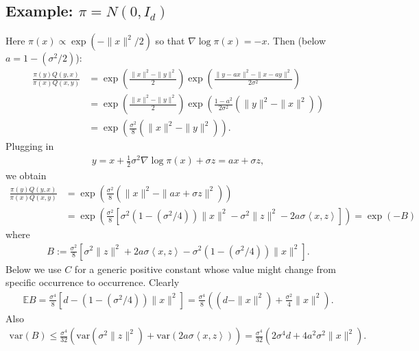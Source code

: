\documentclass{scrartcl}
\newcommand{\E}{{\mathbb E}}
\begin{document}
\subsection{Example: $\pi = N(0, I_d)$}
Here $\pi(x) \propto \exp(-\|x\|^2/2)$ so that $\nabla \log \pi(x) =
-x$. Then (below $a = 1 -(\sigma^2/2)$): 
\begin{align*}
  \frac{\pi(y) Q(y, x)}{\pi(x) Q(x, y)} &= \exp \left(\frac{\|x\|^2 -
                                          \|y\|^2}{2} \right) \exp
                                          \left(\frac{\|y - a x\|^2 -
                                          \|x - a y\|^2}{2 \sigma^2}
                                          \right) \\
  &= \exp \left(\frac{\|x\|^2 -
                                          \|y\|^2}{2}  \right) \exp
    \left(\frac{1 - a^2}{2 \sigma^2} \left(\|y\|^2 - \|x\|^2 \right)
    \right) \\
  &= \exp \left(\frac{\sigma^2}{8} \left(\|x\|^2 - \|y\|^2 \right) \right).
\end{align*}
Plugging in
\begin{align*}
  y = x + \frac{1}{2} \sigma^2 \nabla \log \pi(x) + \sigma z = a x +
  \sigma z, 
\end{align*}
we obtain
\begin{align*}
  \frac{\pi(y) Q(y, x)}{\pi(x) Q(x, y)} &= \exp
  \left(\frac{\sigma^2}{8} \left(\|x\|^2 - \|a x + \sigma z\|^2
                                          \right) \right) \\
  &= \exp \left(\frac{\sigma^2}{8} \left[\sigma^2 (1 -
    (\sigma^2/4)) \|x\|^2 - \sigma^2 \|z\|^2 - 2 a \sigma
    \left< x, z \right>\right] \right) = \exp(-B)
\end{align*}
where
\begin{align*}
  B := \frac{\sigma^2}{8} \left[ \sigma^2 \|z\|^2 + 2 a \sigma
    \left< x, z \right> - \sigma^2 (1 -
    (\sigma^2/4)) \|x\|^2 \right]. 
\end{align*}
Below we use $C$ for a generic positive constant whose value might
change from specific occurrence to occurrence. Clearly
\begin{align*}
  \E B =  \frac{\sigma^4}{8} \left[d -  (1 -
    (\sigma^2/4)) \|x\|^2 \right] = \frac{\sigma^4}{8} \left((d -
  \|x\|^2) + \frac{\sigma^2}{4} \|x\|^2 \right).  
\end{align*}
Also
\begin{align*}
  \text{var}(B) \leq \frac{\sigma^4}{32} \left(\text{var}(\sigma^2
  \|z\|^2) + \text{var}(2 a \sigma \left<x, z \right>) \right) =
  \frac{\sigma^4}{32} \left(2 \sigma^4 d + 4 a^2 \sigma^2 \|x\|^2 \right). 
\end{align*}
\end{document}
